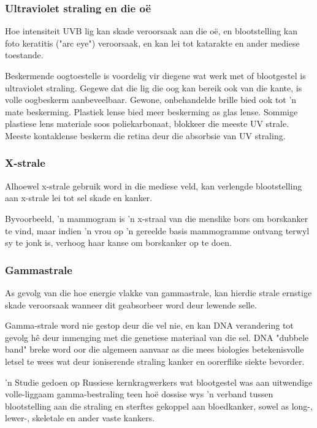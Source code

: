            \subsubsection*{Ultraviolet straling en die o\"e}
            \nopagebreak
        \label{m38779*id189581}Hoe intensiteit UVB lig kan skade veroorsaak aan die o\"e, en blootstelling kan foto keratitis ("arc eye") veroorsaak, en kan lei tot katarakte en ander mediese toestande. \par 
        \label{m38779*id189586}Beskermende oogtoestelle is voordelig vir diegene wat werk met of blootgestel is ultraviolet straling. Gegewe dat die lig die oog kan bereik ook van die kante, is volle oogbeskerm aanbeveelbaar. 
        \label{m38779*id189594} Gewone, onbehandelde brille bied ook tot 'n mate beskerming. Plastiek lense bied meer beskerming as glas lense. Sommige plastiese lens materiale soos poliekarbonaat, blokkeer die meeste UV strale. Meeste kontaklense beskerm die retina deur die absorbsie van UV straling. \par 
      \label{m38779*uid22}
      \begin{minipage}{.5\textwidth}
            \subsubsection*{X-strale}
            \nopagebreak
        \label{m38779*id189613}Alhoewel x-strale gebruik word in die mediese veld, kan verlengde blootstelling aan x-strale lei tot sel skade en kanker. \par 
        \label{m38779*id189617} Byvoorbeeld, 'n mammogram is 'n x-straal van die menslike bors om borskanker te vind, maar indien 'n vrou op 'n gereelde basis mammogramme ontvang terwyl sy te jonk is, verhoog haar kanse om borskanker op te doen. \par 
      \label{m38779*uid23}
            \subsubsection*{Gammastrale}
            \nopagebreak
        \label{m38779*id189632}As gevolg van die hoe energie vlakke van gammastrale, kan hierdie strale ernstige skade veroorsaak wanneer dit geabsorbeer word deur lewende selle. \par 
        \label{m38779*id189636}Gamma-strale word nie gestop deur die vel nie, en kan DNA verandering tot gevolg h\^e deur inmenging met die genetiese materiaal van die sel. DNA "dubbele band" breke word oor die algemeen aanvaar as die mees biologies betekenisvolle letsel te wees wat deur ioniserende straling kanker en oorerflike siekte bevorder. \par 
        \label{m38779*id189642} 'n Studie gedoen op Russiese kernkragwerkers wat blootgestel was aan uitwendige volle-liggaam gamma-bestraling teen ho\"e dossise wys 'n verband tussen blootstelling aan die straling en sterftes gekoppel aan bloedkanker, sowel as long-, lewer-, skeletale en ander vaste kankers. \par 
      \label{m38779*eip-665}
\end{minipage}
